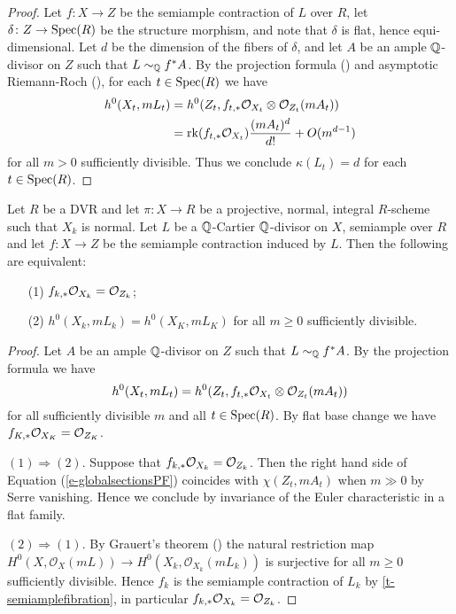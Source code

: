 	\begin{proof}
	Let $f\colon X \to Z$ be the semiample contraction of $L$ over $R$, let $\delta\colon Z\to\operatorname{Spec}(R)$ be the structure morphism, and note that $\delta$ is flat, hence equi-dimensional. Let $d$ be the dimension of the fibers of $\delta$, and let $A$ be an ample $\mathbb{Q}$-divisor on $Z$ such that $L\sim_{\mathbb{Q}}f^\ast A$. By the projection formula (\cite[\href{https://stacks.math.columbia.edu/tag/01E8}{Tag 01E8}]{stacks-project})  and asymptotic Riemann-Roch (\cite[Theorem VI.2.15]{k-rat-curves}), for each $t \in \operatorname{Spec}(R)$ we have
	\begin{equation*}
	\begin{split}
	h^0(X_t,mL_t)&=h^0(Z_t,f_{t,*} \mathcal{O}_{X_t}\otimes\mathcal{O}_{Z_t}(mA_t))\\
	&=\mathrm{rk} (f_{t,*} \mathcal{O}_{X_t})\frac{(mA_t)^d}{d!}+O(m^{d-1})
	\end{split}
	\end{equation*}
	for all $m> 0$ sufficiently divisible. Thus we conclude $\kappa(L_t)=d$ for each $t \in \operatorname{Spec}(R)$.
	\end{proof}
	
	
	\begin{lemma}\label{l-stein-invariance}
	Let $R$ be a DVR and let $\pi \colon X \to R$ be a projective, normal, integral $R$-scheme such that $X_k$ is normal. 
	Let $L$ be a $\mathbb{Q}$-Cartier $\mathbb{Q}$-divisor on $X$, semiample over $R$ and let $f \colon X \to Z$ be the semiample contraction induced by $L$.
	Then the following are equivalent:
	\begin{enumerate}
		\item[(1)] $f_{k,*} \mathcal{O}_{X_k} = \mathcal{O}_{Z_k}$;
		\item[(2)] $h^0(X_k, mL_k)=h^0(X_K, mL_K)$ for all $m\geq 0$ sufficiently divisible.
	\end{enumerate}
\end{lemma}

\begin{proof}
	Let $A$ be an ample $\mathbb{Q}$-divisor on $Z$ such that $L \sim_{\mathbb{Q}}f^*A$. 
	By the projection formula we have 
	\begin{equation}\label{e-globalsectionsPF}
	h^0(X_t,mL_t)=h^0(Z_t,f_{t,\ast}\mathcal{O}_{X_t}\otimes\mathcal{O}_{Z_t}(mA_t))
	\end{equation}
	for all sufficiently divisible $m$ and all $t\in \operatorname{Spec} (R)$. By flat base change we have $f_{K,\ast}\mathcal{O}_{X_K}=\mathcal{O}_{Z_K}$.
	
	$(1) \Rightarrow (2)$. Suppose that $f_{k,\ast}\mathcal{O}_{X_k}=\mathcal{O}_{Z_k}$. Then the right hand side of Equation (\ref{e-globalsectionsPF}) coincides with $\chi(Z_t,mA_t)$ when $m\gg 0$ by Serre vanishing. Hence we conclude by invariance of the Euler characteristic in a flat family.
	
	$(2) \Rightarrow (1)$. By Grauert's theorem (\cite[Corollary III.12.9]{Ha77}) the natural restriction map
	$H^0(X,\mathcal{O}_X(mL))\to H^0(X_k,\mathcal{O}_{X_k}(mL_k))$
	is surjective for all $m \geq 0$ sufficiently divisible. Hence $f_k$ is the semiample contraction of $L_k$ by \autoref{t-semiamplefibration}, in particular $f_{k,\ast}\mathcal{O}_{X_k}=\mathcal{O}_{Z_k}$. 
\end{proof}
	
